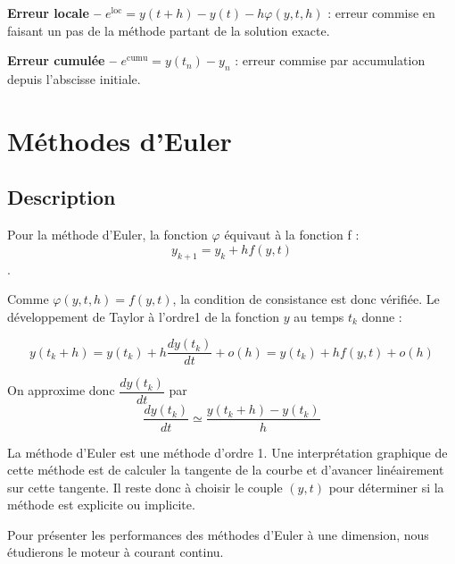 \documentclass[10pt]{article}
\begin{document}
\begin{defi}

\textbf{Erreur locale -- } $e^{\text{loc}}=y(t+h)-y(t)-h\varphi(y,t,h)$ : erreur commise en faisant un pas de la méthode partant de la solution exacte.

\textbf{Erreur cumulée -- } $e^{\text{cumu}} = y(t_n)-y_n$ : erreur commise par accumulation depuis l'abscisse initiale.

\end{defi}

\section{Méthodes d'Euler}

\subsection{Description}
\begin{resultat}
Pour la méthode d’Euler, la fonction $\varphi$ équivaut à la fonction f : 	$$y_{k+1}=y_k+hf(y,t)$$.

Comme $\varphi(y,t,h)=f(y,t)$, la condition de consistance est donc vérifiée. Le développement de Taylor à l’ordre1 de la fonction $y$ au temps $t_k$ donne :

$$y(t_k+h)=y(t_k)+h \dfrac{dy(t_k)}{dt}+o(h)=y(t_k)+hf(y,t)+o(h)$$

On approxime donc $\dfrac{dy(t_k)}{dt}$ par 
$$
\dfrac{dy(t_k)}{dt} \simeq \dfrac{y(t_k+h) - y(t_k)}{h}
$$
\end{resultat}

La méthode d’Euler est une méthode d’ordre 1. Une interprétation graphique de cette méthode est de calculer la tangente de la courbe et d’avancer linéairement sur cette tangente. Il reste donc à choisir le couple $(y,t)$ pour déterminer si la méthode est explicite ou implicite.

Pour présenter les performances des méthodes d’Euler à une dimension, nous étudierons le moteur à courant continu.
\end{document}
